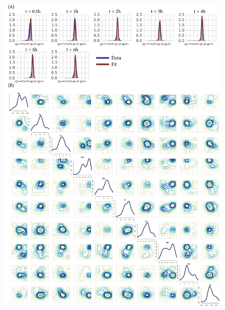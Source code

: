  
\begin{figure}[htbp]
\centering
	\includegraphics[scale=0.6]{../../chapters/chapterABCFlow/images/1D_real_res.png}
	\caption[LoF caption]{\label{fig:1d-real-res}}
\end{figure}




 
 

